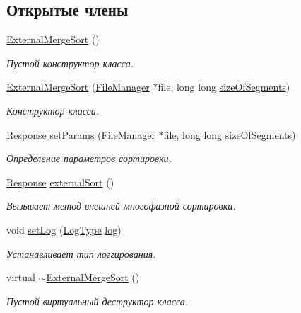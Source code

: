 \subsection*{Открытые члены}
\begin{DoxyCompactItemize}
\item 
\hyperlink{class_external_merge_sort_a7b6efcd2abbf59a8983f972c52d04650}{External\+Merge\+Sort} ()
\begin{DoxyCompactList}\small\item\em Пустой конструктор класса. \end{DoxyCompactList}\item 
\hyperlink{class_external_merge_sort_a37df182916b341d5466f2fff0d50dfed}{External\+Merge\+Sort} (\hyperlink{class_file_manager}{File\+Manager} $\ast$file, long long \hyperlink{class_external_merge_sort_a1d68bb5e0373cf16807a41272dff1a99}{size\+Of\+Segments})
\begin{DoxyCompactList}\small\item\em Конструктор класса. \end{DoxyCompactList}\item 
\hyperlink{_structures_8h_ab3500e5d3c915d1b5cc58dcab8673fd4}{Response} \hyperlink{class_external_merge_sort_a45719200cc5e3111fe68c08fe36be715}{set\+Params} (\hyperlink{class_file_manager}{File\+Manager} $\ast$file, long long \hyperlink{class_external_merge_sort_a1d68bb5e0373cf16807a41272dff1a99}{size\+Of\+Segments})
\begin{DoxyCompactList}\small\item\em Определение параметров сортировки. \end{DoxyCompactList}\item 
\hyperlink{_structures_8h_ab3500e5d3c915d1b5cc58dcab8673fd4}{Response} \hyperlink{class_external_merge_sort_a0f17e02ed3c66bc241123cc1ee01aded}{external\+Sort} ()
\begin{DoxyCompactList}\small\item\em Вызывает метод внешней многофазной сортировки. \end{DoxyCompactList}\item 
void \hyperlink{class_external_merge_sort_ac0eeaba67ee0703acf73a8a5bf78ebe1}{set\+Log} (\hyperlink{_structures_8h_af67907baa897e9fb84df0cb89795b87c}{Log\+Type} \hyperlink{class_external_merge_sort_a41f61c3beb7dc529d7f2a8b2b4ee380b}{log})
\begin{DoxyCompactList}\small\item\em Устанавливает тип логгирования. \end{DoxyCompactList}\item 
virtual \hyperlink{class_external_merge_sort_adfee7073120e0ae832c96977440b2fb4}{$\sim$\+External\+Merge\+Sort} ()
\begin{DoxyCompactList}\small\item\em Пустой виртуальный деструктор класса. \end{DoxyCompactList}\end{DoxyCompactItemize}
